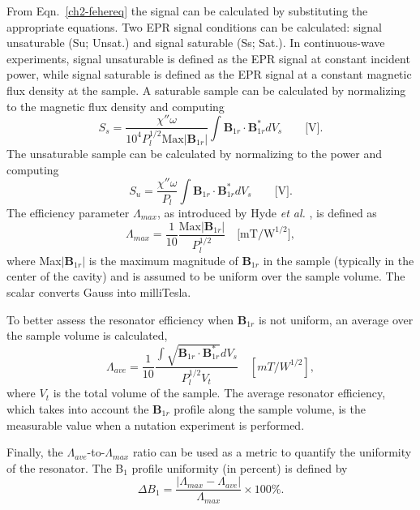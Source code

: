 From Eqn.~\ref{ch2-fehereq} the signal can be calculated by substituting the appropriate equations. Two EPR signal conditions can be calculated: signal unsaturable (Su; Unsat.) and signal saturable (Ss; Sat.). In continuous-wave experiments, signal unsaturable is defined as the EPR signal at constant incident power, while signal saturable is defined as the EPR signal at a constant magnetic flux density at the sample.\cite{hydehoff,misrabook} A saturable sample can be calculated by normalizing to the magnetic flux density and computing
\begin{equation}
    S_s = \frac{\chi'' \omega}{10^4 P_l^{1/2} \text{Max}|\mathbf{B}_{1r}|} \int \mathbf{B}_{1r} \cdot \mathbf{B}_{1r}^* dV_s \qquad \text{[V]}. \label{ch2-eq:ss}
\end{equation}{}
The unsaturable sample can be calculated by normalizing to the power and computing
\begin{equation}
    S_u = \frac{\chi'' \omega}{P_l} \int \mathbf{B}_{1r} \cdot \mathbf{B}_{1r}^* dV_s \qquad  \text{[V]}. \label{ch2-eq:su}
\end{equation}{}
The efficiency parameter $\Lambda_{max}$, as introduced by Hyde {\em et al.} \cite{hydehoff}, is defined as
\begin{equation}
    \Lambda_{max} = \frac{1}{10}\frac{\text{Max}|\mathbf{B}_{1r}|}{P_l^{1/2}} \quad \text{[mT/W}^{1/2}], \label{ch2-eq:lammax}
\end{equation}
where Max$|\mathbf{B}_{1r}|$ is the maximum magnitude of $\mathbf{B}_{1r}$ in the sample (typically in the center of the cavity) and is assumed to be uniform over the sample volume. \cite{hydehoff} The scalar converts Gauss into milliTesla. 

To better assess the resonator efficiency when $\mathbf{B}_{1r}$ is not uniform, an average over the sample volume is calculated, 
\begin{equation}
    \Lambda_{ave} = \frac{1}{10}\frac{\int \sqrt{\mathbf{B}_{1r} \cdot \mathbf{B}_{1r}^*} dV_s}{P_l^{1/2} V_t} \quad [mT/W^{1/2}], \label{ch2-eq:lamave}
\end{equation}
where $V_t$ is the total volume of the sample. The average resonator efficiency, which takes into account the $\mathbf{B}_{1r}$ profile along the sample volume, is the measurable value when a nutation experiment is performed.

Finally, the $\Lambda_{ave}$-to-$\Lambda_{max}$ ratio can be used as a metric to quantify the uniformity of the resonator. \cite{UFLGR2017} The B$_1$ profile uniformity (in percent) is defined by 
\begin{equation}
    \Delta B_1 = \frac{\left| \Lambda_{max} - \Lambda_{ave} \right|}{\Lambda_{max}} \times 100\%.
\end{equation}


